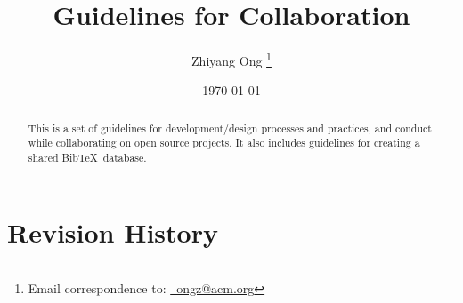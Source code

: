 \documentclass[letter,12pt]{article}
\begin{document}
\title{Guidelines for Collaboration}
\date{\today}
\author{Zhiyang Ong \thanks{Email correspondence to: \href{mailto:ongz@acm.org}{\Email\ ongz@acm.org}}}
\maketitle


\begin{abstract} 
This is a set of guidelines for development/design processes and practices, and conduct while collaborating on open source projects. It also includes guidelines for creating a shared {\sc Bib}\TeX\ database.
\end{abstract}


\tableofcontents
\setcounter{secnumdepth}{4}



\section*{Revision History}
\label{sec:RevisionHistory}
\end{document}
